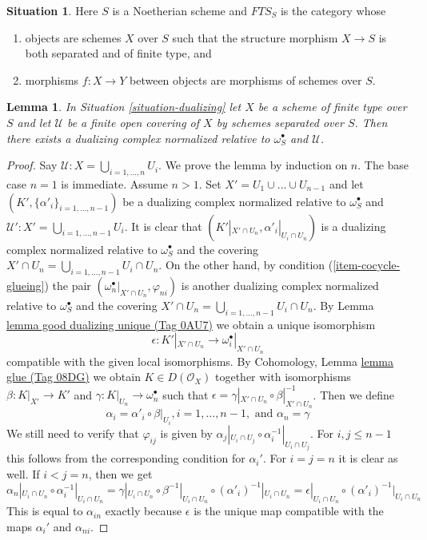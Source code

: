 \documentclass{amsart}
\theoremstyle{plain}
\newtheorem{lemma}[subsection]{Lemma}
\theoremstyle{definition}
\newtheorem{situation}[subsection]{Situation}
\theoremstyle{remark}
\numberwithin{equation}{subsection}
\begin{document}
\begin{situation}
\label{situation-shriek}
Here $S$ is a Noetherian scheme and $\textit{FTS}_S$ is the category whose
\begin{enumerate}
\item objects are schemes $X$ over $S$ such that the structure
morphism $X \to S$ is both separated and of finite type, and
\item morphisms $f : X \to Y$ between objects are morphisms
of schemes over $S$.
\end{enumerate}
\end{situation}

\begin{lemma}
\label{lemma-existence-good-dualizing}
In Situation \ref{situation-dualizing} let $X$ be a scheme of finite type
over $S$ and let $\mathcal{U}$ be a finite open covering
of $X$ by schemes separated over $S$. Then there exists
a dualizing complex normalized relative to $\omega_S^\bullet$ and
$\mathcal{U}$.
\end{lemma}

\begin{proof}
Say $\mathcal{U} : X = \bigcup_{i = 1, \ldots, n} U_i$.
We prove the lemma by induction on $n$. The base case $n = 1$ is immediate.
Assume $n > 1$. Set $X' = U_1 \cup \ldots \cup U_{n - 1}$
and let $(K', \{\alpha'_i\}_{i = 1, \ldots, n - 1})$
be a dualizing complex normalized relative to $\omega_S^\bullet$
and $\mathcal{U}' : X' = \bigcup_{i = 1, \ldots, n - 1} U_i$.
It is clear that $(K'|_{X' \cap U_n}, \alpha'_i|_{U_i \cap U_n})$
is a dualizing complex normalized relative to $\omega_S^\bullet$
and the covering
$X' \cap U_n = \bigcup_{i = 1, \ldots, n - 1} U_i \cap U_n$.
On the other hand, by condition (\ref{item-cocycle-glueing}) the pair
$(\omega_n^\bullet|_{X' \cap U_n}, \varphi_{ni})$
is another dualizing complex normalized relative to $\omega_S^\bullet$
and the covering
$X' \cap U_n = \bigcup_{i = 1, \ldots, n - 1} U_i \cap U_n$.
By Lemma \href{https://stacks.math.columbia.edu/tag/0AU7}{lemma good dualizing unique (Tag 0AU7)} we obtain a unique isomorphism
$$
\epsilon : K'|_{X' \cap U_n} \longrightarrow \omega_i^\bullet|_{X' \cap U_n}
$$
compatible with the given local isomorphisms.
By Cohomology, Lemma \href{https://stacks.math.columbia.edu/tag/08DG}{lemma glue (Tag 08DG)}
we obtain $K \in D(\mathcal{O}_X)$ together with
isomorphisms $\beta : K|_{X'} \to K'$ and
$\gamma : K|_{U_n} \to \omega_n^\bullet$ such that
$\epsilon = \gamma|_{X'\cap U_n} \circ \beta|_{X' \cap U_n}^{-1}$.
Then we define
$$
\alpha_i = \alpha'_i \circ \beta|_{U_i}, i = 1, \ldots, n - 1,
\text{ and }
\alpha_n = \gamma
$$
We still need to verify that $\varphi_{ij}$ is given by
$\alpha_j|_{U_i \cap U_j} \circ \alpha_i^{-1}|_{U_i \cap U_j}$.
For $i, j \leq n - 1$ this follows from the corresponding
condition for $\alpha_i'$. For $i = j = n$ it is clear as well.
If $i < j = n$, then we get
$$
\alpha_n|_{U_i \cap U_n} \circ \alpha_i^{-1}|_{U_i \cap U_n} =
\gamma|_{U_i \cap U_n} \circ \beta^{-1}|_{U_i \cap U_n}
\circ (\alpha'_i)^{-1}|_{U_i \cap U_n} =
\epsilon|_{U_i \cap U_n} \circ (\alpha'_i)^{-1}|_{U_i \cap U_n}
$$
This is equal to $\alpha_{in}$ exactly because $\epsilon$
is the unique map compatible with the maps
$\alpha_i'$ and $\alpha_{ni}$.
\end{proof}
\end{document}

